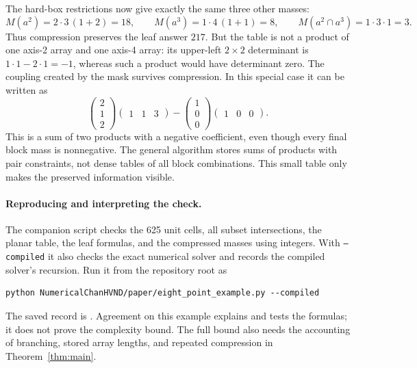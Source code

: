 The hard-box restrictions now give exactly the same three other masses:
\[
 M(a^2)=2\cdot3\,(1+2)=18,\qquad
 M(a^3)=1\cdot4\,(1+1)=8,\qquad
 M(a^2\cap a^3)=1\cdot3\cdot1=3.
\]
Thus compression preserves the leaf answer $217$. But the table is
not a product of one axis-2 array and one axis-4 array: its upper-left
$2\times2$ determinant is $1\cdot1-2\cdot1=-1$, whereas such a product
would have determinant zero. The coupling created by the mask survives
compression. In this special case it can be written as
\[
 \begin{pmatrix}2\\1\\2\end{pmatrix}
 \begin{pmatrix}1&1&3\end{pmatrix}
 -
 \begin{pmatrix}1\\0\\0\end{pmatrix}
 \begin{pmatrix}1&0&0\end{pmatrix}.
\]
This is a sum of two products with a negative coefficient, even though
every final block mass is nonnegative. The general algorithm stores
sums of products with pair constraints, not dense tables of all block
combinations. This small table only makes the preserved information visible.

\paragraph{Reproducing and interpreting the check.}
The companion script  checks the 625 unit cells,
all subset intersections, the planar table, the leaf formulas, and the
compressed masses using integers. With \texttt{--compiled} it also checks
the exact numerical solver and records the compiled solver's recursion.
Run it from the repository root as
\begin{lstlisting}
python NumericalChanHVND/paper/eight_point_example.py --compiled
\end{lstlisting}
The saved record is . Agreement on this
example explains and tests the formulas; it does not prove the complexity
bound. The full bound also needs the accounting of branching, stored
array lengths, and repeated compression in Theorem~\ref{thm:main}.
